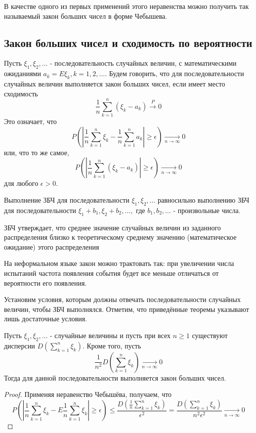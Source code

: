 В качестве одного из первых применений этого неравенства можно получить так называемый закон больших чисел в форме Чебышева.

\subsection{Закон больших чисел и сходимость по вероятности}

\begin{definition}
	Пусть $\xi_1, \xi_2, \dots$ - последовательность случайных величин, с математическими ожиданиями $a_k = E\xi_k, k = 1, 2, \dots$. Будем говорить, что для последовательности случайных величин выполняется закон больших чисел, если имеет место сходимость
	\[ \frac{1}{n} \sum_{k=1}^{n} (\xi_k - a_k) \overset{P}{\to} 0 \]
	Это означает, что
	\[ P \left( \left| \frac{1}{n} \sum_{k=1}^{n} \xi_k - \frac{1}{n} \sum_{k=1}^{n} a_k \right| \ge \epsilon \right) \underset{n \to \infty}{\to} 0 \]
	или, что то же самое,
	\[ P \left( \left| \frac{1}{n} \sum_{k=1}^{n} (\xi_k - a_k) \right| \ge \epsilon \right) \underset{n \to \infty}{\to} 0 \]
	для любого $\epsilon > 0$.
\end{definition}
\begin{remark}
	Выполнение ЗБЧ для последовательности $\xi_1, \xi_2, \dots$ равносильно выполнению ЗБЧ для последовательности $\xi_1 + b_1, \xi_2 + b_2, \dots,$ где $b_1, b_2, \dots$ - произвольные числа.
\end{remark}

ЗБЧ утверждает, что среднее значение случайных величин из заданного распределения близко к теоретическому среднему значению (математическое ожидание) этого распределения

На неформальном языке закон можно трактовать так: при увеличении числа испытаний частота появления события будет все меньше отличаться от вероятности его появления.

Установим условия, которым должны отвечать последовательности случайных величин, чтобы ЗБЧ выполнялся. Отметим, что приведённые теоремы указывают лишь достаточные условия.

\begin{theorem}
	Пусть $\xi_1, \xi_2, \dots$ - случайные величины и пусть при всех $n \ge 1$ существуют дисперсии $D \left( \sum\limits_{k=1}^{n} \xi_k \right)$. Кроме того, пусть
	\[ \frac{1}{n^2} D \left( \sum\limits_{k=1}^{n} \xi_k \right) \underset{n \to \infty}{\to} 0 \]
	Тогда для данной последовательности выполняется закон больших чисел.
	\begin{proof}
		Применяя неравенство Чебышёва, получаем, что
		\[
		P \left( \left| \frac{1}{n} \sum_{k=1}^{n} \xi_k - E \frac{1}{n} \sum_{k=1}^{n} \xi_k \right| \ge \epsilon \right) \le \frac{D \left( \frac{1}{n} \sum\limits_{k=1}^{n} \xi_k \right)}{\epsilon^2} = \frac{D \left( \sum\limits_{k=1}^{n} \xi_k \right)}{n^2 \epsilon^2} \underset{n \to \infty}{\to} 0
		\]
	\end{proof}
\end{theorem}

